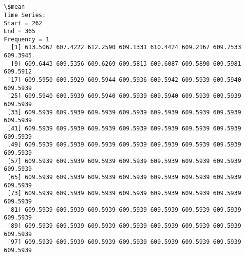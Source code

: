\documentclass[11pt]{article}
\begin{document}
    \begin{center}
    \end{center}
    { \hspace*{\fill} \\}
    
    \begin{center}
    \end{center}
    { \hspace*{\fill} \\}
    
    \begin{Verbatim}[commandchars=\\\{\}]
\$mean
Time Series:
Start = 262 
End = 365 
Frequency = 1 
  [1] 613.5062 607.4222 612.2590 609.1331 610.4424 609.2167 609.7533 609.3945
  [9] 609.6443 609.5356 609.6269 609.5813 609.6087 609.5890 609.5981 609.5912
 [17] 609.5950 609.5929 609.5944 609.5936 609.5942 609.5939 609.5940 609.5939
 [25] 609.5940 609.5939 609.5940 609.5939 609.5940 609.5939 609.5939 609.5939
 [33] 609.5939 609.5939 609.5939 609.5939 609.5939 609.5939 609.5939 609.5939
 [41] 609.5939 609.5939 609.5939 609.5939 609.5939 609.5939 609.5939 609.5939
 [49] 609.5939 609.5939 609.5939 609.5939 609.5939 609.5939 609.5939 609.5939
 [57] 609.5939 609.5939 609.5939 609.5939 609.5939 609.5939 609.5939 609.5939
 [65] 609.5939 609.5939 609.5939 609.5939 609.5939 609.5939 609.5939 609.5939
 [73] 609.5939 609.5939 609.5939 609.5939 609.5939 609.5939 609.5939 609.5939
 [81] 609.5939 609.5939 609.5939 609.5939 609.5939 609.5939 609.5939 609.5939
 [89] 609.5939 609.5939 609.5939 609.5939 609.5939 609.5939 609.5939 609.5939
 [97] 609.5939 609.5939 609.5939 609.5939 609.5939 609.5939 609.5939 609.5939


\end{Verbatim}
\end{document}
